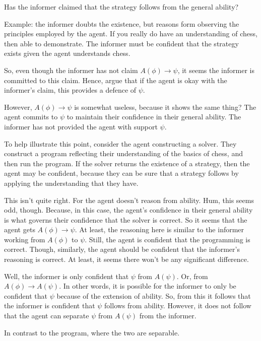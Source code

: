 \documentclass[10pt]{article}
\begin{document}
\begin{note}
Has the informer claimed that the strategy follows from the general ability?

Example: the informer doubts the existence, but reasons form observing the principles employed by the agent.
If you really do have an understanding of chess, then able to demonstrate.
The informer must be confident that the strategy exists given the agent understands chess.

So, even though the informer has not claim \(A(\phi) \rightarrow \psi\), it seems the informer is committed to this claim.
Hence, argue that if the agent is okay with the informer's claim, this provides a defence of \(\psi\).

However, \(A(\phi) \rightarrow \psi\) is somewhat useless, because it shows the same thing?
The agent commits to \(\psi\) to maintain their confidence in their general ability.
The informer has not provided the agent with support \(\psi\).

To help illustrate this point, consider the agent constructing a solver.
They construct a program reflecting their understanding of the basics of chess, and then run the program.
If the solver returns the existence of a strategy, then the agent may be confident, because they can be sure that a strategy follows by applying the understanding that they have.

This isn't quite right.
For the agent doesn't reason from ability.
Hum, this seems odd, though.
Because, in this case, the agent's confidence in their general ability is what governs their confidence that the solver is correct.
So it seems that the agent gets \(A(\phi) \rightarrow \psi\).
At least, the reasoning here is similar to the informer working from \(A(\phi)\) to \(\psi\).
Still, the agent is confident that the programming is correct.
Though, similarly, the agent should be confident that the informer's reasoning is correct.
At least, it seems there won't be any significant difference.

Well, the informer is only confident that \(\psi\) from \(A(\psi)\).
Or, from \(A(\phi) \rightarrow A(\psi)\).
In other words, it is possible for the informer to only be confident that \(\psi\) because of the extension of ability.
So, from this it follows that the informer is confident that \(\psi\) follows from ability.
However, it does not follow that the agent can separate \(\psi\) from \(A(\psi)\) from the informer.

In contrast to the program, where the two are separable.


\end{note}
\end{document}

